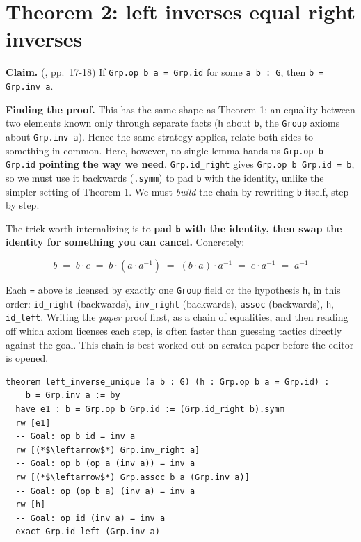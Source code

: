\section{Theorem 2: left inverses equal right inverses}\label{sec:08-group-theorems:03-theorem-2:1}

\textbf{Claim.} (\cite{DummitFoote2003}, pp.~17-18) If \texttt{Grp.op b a = Grp.id} for some \texttt{a b : G}, then \texttt{b = Grp.inv a}.

\textbf{Finding the proof.} This has the same shape as Theorem 1: an equality between two elements known only through separate facts (\texttt{h} about \texttt{b}, the \texttt{Group} axioms about \texttt{Grp.inv a}). Hence the same strategy applies, relate both sides to something in common. Here, however, no single lemma hands us \texttt{Grp.op b Grp.id} \textbf{pointing the way we need}. \texttt{Grp.id\_\allowbreak{}right} gives \texttt{Grp.op b Grp.id = b}, so we must use it backwards (\texttt{.symm}) to pad \texttt{b} with the identity, unlike the simpler setting of Theorem 1. We must \emph{build} the chain by rewriting \texttt{b} itself, step by step.

The trick worth internalizing is to \textbf{pad \texttt{b} with the identity, then swap the identity for something you can cancel.} Concretely:

\[
b \;=\; b \cdot e \;=\; b \cdot (a \cdot a^{-1}) \;=\; (b \cdot a) \cdot a^{-1} \;=\; e \cdot a^{-1} \;=\; a^{-1}
\]

Each \texttt{=} above is licensed by exactly one \texttt{Group} field or the hypothesis \texttt{h}, in this order: \texttt{id\_\allowbreak{}right} (backwards), \texttt{inv\_\allowbreak{}right} (backwards), \texttt{assoc} (backwards), \texttt{h}, \texttt{id\_\allowbreak{}left}. Writing the \emph{paper} proof first, as a chain of equalities, and then reading off which axiom licenses each step, is often faster than guessing tactics directly against the goal. This chain is best worked out on scratch paper before the editor is opened.

\begin{lstlisting}
theorem left_inverse_unique (a b : G) (h : Grp.op b a = Grp.id) :
    b = Grp.inv a := by
  have e1 : b = Grp.op b Grp.id := (Grp.id_right b).symm
  rw [e1]
  -- Goal: op b id = inv a
  rw [(*$\leftarrow$*) Grp.inv_right a]
  -- Goal: op b (op a (inv a)) = inv a
  rw [(*$\leftarrow$*) Grp.assoc b a (Grp.inv a)]
  -- Goal: op (op b a) (inv a) = inv a
  rw [h]
  -- Goal: op id (inv a) = inv a
  exact Grp.id_left (Grp.inv a)
\end{lstlisting}

